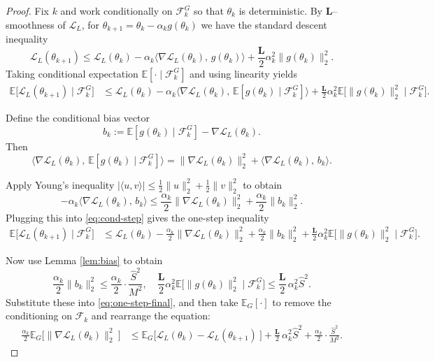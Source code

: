 \documentclass[reqno, 11pt]{amsart}%
\newcommand\cF{\mathcal F}
\newcommand\cL{\mathcal L}
\newcommand\EE{\mathbb E}
\theoremstyle{definition}
\begin{document}
\begin{proof}
Fix $k$ and work conditionally on $\cF_k^G$ so that $\theta_k$ is deterministic.
By $\mathbf{L}$--smoothness of $\cL_{L}$,
for $\theta_{k+1}=\theta_k-\alpha_k g(\theta_k)$ we have the standard descent inequality
\begin{equation}
\label{eq:smooth-descent}
\cL_{L}(\theta_{k+1})
\le
\cL_{L}(\theta_k)
-\alpha_k\big\langle\nabla \cL_{L}(\theta_k),\, g(\theta_k)\big\rangle
+\frac{\mathbf{L}}{2}\alpha_k^2\|g(\theta_k)\|_2^2.
\end{equation}
Taking conditional expectation $\EE[\cdot\mid \cF_k^G]$ and using linearity yields
\begin{align}
\label{eq:cond-step}
\EE\!\big[\cL_{L}(\theta_{k+1})\mid \cF_k^G\big]
&\le
\cL_{L}(\theta_k)
-\alpha_k\Big\langle\nabla \cL_{L}(\theta_k),\,\EE[g(\theta_k)\mid \cF_k^G]\Big\rangle
+\frac{\mathbf{L}}{2}\alpha_k^2\EE\!\big[\|g(\theta_k)\|_2^2\mid \cF_k^G\big].
\end{align}

Define the conditional bias vector
\[
b_k
:=
\EE[g(\theta_k)\mid \cF_k^G]-\nabla \cL_{L}(\theta_k).
\]
Then
\[
\Big\langle\nabla \cL_{L}(\theta_k),\,\EE[g(\theta_k)\mid \cF_k^G]\Big\rangle
=
\|\nabla \cL_{L}(\theta_k)\|_2^2
+
\big\langle\nabla \cL_{L}(\theta_k),\, b_k\big\rangle.
\]

Apply Young's inequality $|\langle u,v\rangle|\le \tfrac12\|u\|_2^2+\tfrac12\|v\|_2^2$ to obtain
\[
-\alpha_k\big\langle\nabla \cL_{L}(\theta_k),\, b_k\big\rangle
\le
\frac{\alpha_k}{2}\|\nabla \cL_{L}(\theta_k)\|_2^2
+\frac{\alpha_k}{2}\|b_k\|_2^2.
\]
Plugging this into \eqref{eq:cond-step} gives the one-step inequality
\begin{align}
\label{eq:one-step-final}
\EE\!\big[\cL_{L}(\theta_{k+1})\mid \cF_k^G\big]
&\le
\cL_{L}(\theta_k)
-\frac{\alpha_k}{2}\|\nabla \cL_{L}(\theta_k)\|_2^2
+\frac{\alpha_k}{2}\|b_k\|_2^2
+\frac{\mathbf{L}}{2}\alpha_k^2\EE\!\big[\|g(\theta_k)\|_2^2\mid \cF_k^G\big].
\end{align}

Now use Lemma \ref{lem:bias} to obtain
\[
\frac{\alpha_k}{2}\|b_k\|_2^2
\le
\frac{\alpha_k}{2}\cdot \frac{\hat{S}^2}{M^2}, \quad 
\frac{\mathbf{L}}{2}\alpha_k^2\EE\!\big[\|g(\theta_k)\|_2^2\mid \cF_k^G\big]
\le
\frac{\mathbf{L}}{2} \, \alpha_k^2 \hat{S}^2.
\]
Substitute these into \eqref{eq:one-step-final}, and then take $\EE_G[\cdot]$ to remove the conditioning on $\cF_k$ and rearrange the equation:
\begin{align}
\label{eq:avg-bound-pre}
\frac{\alpha_k}{2}\EE_G\!\Big[\|\nabla \cL_{L}(\theta_k)\|_2^2\ \Big]
&\le
\EE_G\!\Big[\cL_{L}(\theta_k)-\cL_{L}(\theta_{k+1})\ \Big]
+\frac{\mathbf{L}}{2}  \, \alpha_k^2 \hat{S}^2
+\frac{\alpha_k}{2}\cdot \frac{\hat{S}^2}{M^2}.
\end{align}


\end{proof}
\end{document}
